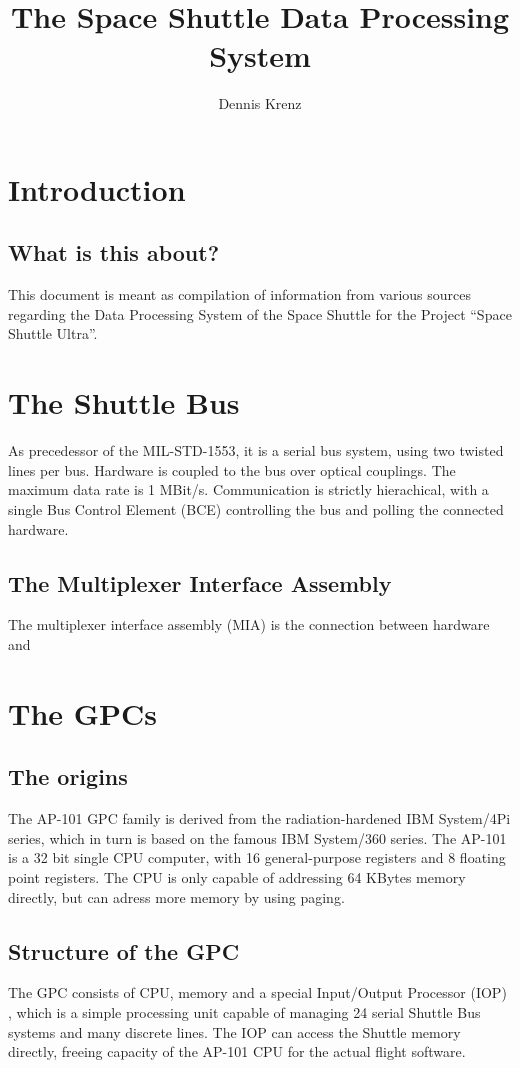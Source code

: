 \documentclass[a4paper, twocolumn, 11pt]{book}
\begin{document}
\title{The Space Shuttle Data Processing System}
\author{Dennis Krenz}
\maketitle
\tableofcontents
\chapter{Introduction}
\section{What is this about?}
This document is meant as compilation of information from various sources
regarding the Data Processing System of the Space Shuttle for the Project
``Space Shuttle Ultra''.
\chapter{The Shuttle Bus}
As precedessor of the MIL-STD-1553, it is a serial bus system, using two twisted
lines per bus. Hardware is coupled to the bus over optical couplings. The
maximum data rate is 1 MBit/s. Communication is strictly hierachical, with a
single Bus Control Element (BCE) controlling the bus and polling the connected
hardware.
\section{The Multiplexer Interface Assembly}
The multiplexer interface assembly (MIA) is the connection between hardware and
\chapter{The GPCs}
\section{The origins}
The AP-101 GPC family is derived from the radiation-hardened IBM
System/4Pi series, which in turn
is based on the famous IBM System/360 series. The AP-101 is a 32 bit single CPU
computer, with 16 general-purpose registers and 8 floating point registers. The
CPU is only capable of addressing 64 KBytes memory directly, but can adress more
memory by using paging.
\section{Structure of the GPC}
The GPC consists of CPU, memory and a special Input/Output Processor (IOP)
, which is a simple processing unit capable of
managing 24 serial Shuttle Bus systems and many discrete lines. The IOP can
access the Shuttle memory directly, freeing capacity of the AP-101 CPU for the
actual flight software.
\end{document}
